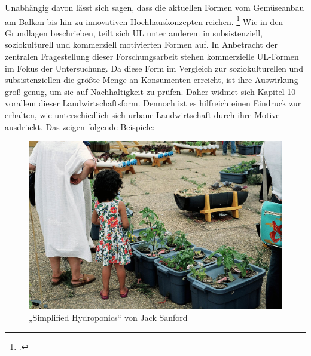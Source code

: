 \documentclass{scrartcl}
\begin{document}
Unabhängig davon lässt sich sagen, dass die aktuellen Formen vom Gemüseanbau am Balkon bis hin zu innovativen Hochhauskonzepten reichen. \footcites[Vgl.][S.24]{Berges2014UrbaneStadt}[S.268]{Zezza2010UrbanCountries}[S.14]{Al-Kodmany2018TheCity} Wie in den Grundlagen beschrieben, teilt sich UL unter anderem in subsistenziell, soziokulturell und kommerziell motivierten Formen auf. In Anbetracht der zentralen Fragestellung dieser Forschungsarbeit stehen kommerzielle UL-Formen im Fokus der Untersuchung. Da diese Form im Vergleich zur soziokulturellen und subsistenziellen die größte Menge an Konsumenten erreicht, ist ihre Auswirkung groß genug, um sie auf Nachhaltigkeit zu prüfen. Daher widmet sich Kapitel 10 vorallem dieser Landwirtschaftsform. Dennoch ist es hilfreich einen Eindruck zur erhalten, wie unterschiedlich sich urbane Landwirtschaft durch ihre Motive ausdrückt. Das zeigen folgende Beispiele:

\begin{figure}[htbp]
    \centering
    \includegraphics[width=14cm]{image_folder/simplified_hydroponics_jack_sanford.jpg}
  \caption{„Simplified Hydroponics“ von Jack Sanford}
  \label{fig:shydroponics}
\end{figure} 
\end{document}

